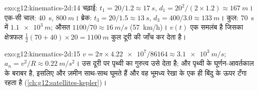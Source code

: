 \begin{solution}{exo:g12:kinematics-2d:14}
चढ़ाई: $t_1 = 20/1.2 \approx \qty{17}{s}$, $d_1 = 20^2/(2 \times 1.2) \approx \qty{167}{m}$। एक-सी चाल: \qty{40}{s}, $\qty{800}{m}$। ब्रेक: $t_3 = 20/1.5 \approx
\qty{13}{s}$, $d_3 = 400/3.0 \approx \qty{133}{m}$। कुल:
\qty{70}{s} में $\qty{1.1e3}{m}$; औसत $1100/70 \approx
\qty{16}{m/s}$ (\qty{57}{km/h})। $v(t)$ एक समलंब है जिसका क्षेत्रफल
$\tfrac12(70 + 40) \times 20 = \qty{1100}{m}$ कुल दूरी की जाँच कर देता है।
\end{solution}

\begin{solution}{exo:g12:kinematics-2d:15}
$v = 2\pi \times \num{4.22e7}/\num{86164} \approx \qty{3.1e3}{m/s}$; $a_n = v^2/R \approx \qty{0.22}{m/s^2}$। उस दूरी पर पृथ्वी का गुरुत्व उसे देता है; और
 पृथ्वी के घूर्णन-आवर्तकाल के बराबर है, इसलिए
 और ज़मीन साथ-साथ घूमते हैं और वह भूमध्य रेखा के एक ही बिंदु के
ऊपर टँगा रहता है (\cref{ch:g12:satellites-kepler})।
\end{solution}

